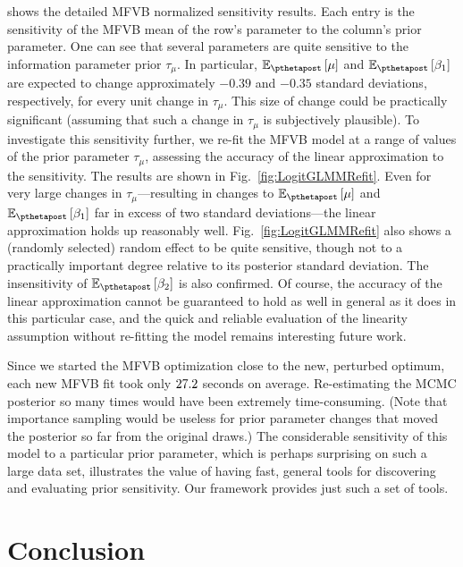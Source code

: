 \documentclass{article}\usepackage[]{graphicx}\usepackage[]{color}
\theoremstyle{definition}
\theoremstyle{plain}
\theoremstyle{plain}
\theoremstyle{plain}
\theoremstyle{definition}
\theoremstyle{plain}
\theoremstyle{plain}
\newcommand{\fig}[1]{Fig.~\ref{fig:#1}}
\begin{document}
 shows the detailed MFVB normalized sensitivity
results. Each entry is the sensitivity of the MFVB mean of the row's
parameter to the column's prior parameter. One can see that several
parameters are quite sensitive to the information parameter prior
$\tau_{\mu}.$ In particular, $\mbe_{\pthetapost}\left[\mu\right]$
and $\mbe_{\pthetapost}\left[\beta_{1}\right]$ are expected to change
approximately $-0.39$ and $-0.35$ standard deviations, respectively,
for every unit change in $\tau_{\mu}$. This size of change could
be practically significant (assuming that such a change in $\tau_{\mu}$
is subjectively plausible). To investigate this sensitivity further,
we re-fit the MFVB model at a range of values of the prior parameter
$\tau_{\mu}$, assessing the accuracy of the linear approximation
to the sensitivity. The results are shown in \fig{LogitGLMMRefit}.
Even for very large changes in $\tau_{\mu}$---resulting
in changes to $\mbe_{\pthetapost}\left[\mu\right]$ and $\mbe_{\pthetapost}\left[\beta_{1}\right]$
far in excess of two standard deviations---the linear approximation
holds up reasonably well. \fig{LogitGLMMRefit} also shows a (randomly
selected) random effect to be quite sensitive, though not to a practically
important degree relative to its posterior standard deviation. The
insensitivity of $\mbe_{\pthetapost}\left[\beta_{2}\right]$ is also
confirmed. Of course, the accuracy of the linear approximation cannot
be guaranteed to hold as well in general as it does in this particular
case, and the quick and reliable evaluation of the linearity assumption
without re-fitting the model remains interesting future work.

Since we started the MFVB optimization close to the new, perturbed
optimum, each new MFVB fit took only $27.2$ seconds
on average. Re-estimating the MCMC posterior so many times would have
been extremely time-consuming. (Note that importance sampling would
be useless for prior parameter changes that moved the posterior so
far from the original draws.) The considerable sensitivity of this
model to a particular prior parameter, which is perhaps surprising
on such a large data set, illustrates the value of having fast, general
tools for discovering and evaluating prior sensitivity. Our framework
provides just such a set of tools.
 

\section{Conclusion
\label{sec:Conclusion}}
\end{document}
